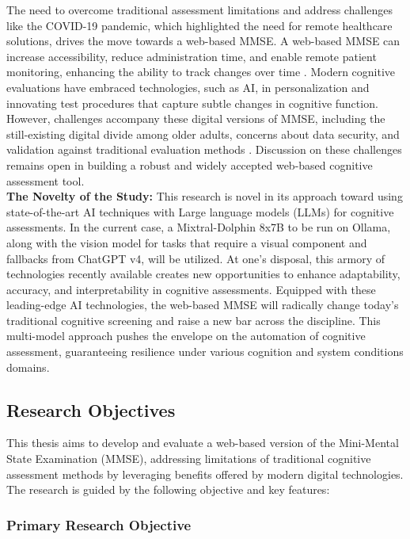 The need to overcome traditional assessment limitations and address challenges like the COVID-19 pandemic, which highlighted the need for remote healthcare solutions, drives the move towards a web-based MMSE. A web-based MMSE can increase accessibility, reduce administration time, and enable remote patient monitoring, enhancing the ability to track changes over time \cite{Bauer2012, Seifan2015, Zygouris2017, Geddes2020, Cullum2014, Lim2020, Harrington2021}. Modern cognitive evaluations have embraced technologies, such as AI, in personalization and innovating test procedures that capture subtle changes in cognitive function. However, challenges accompany these digital versions of MMSE, including the still-existing digital divide among older adults, concerns about data security, and validation against traditional evaluation methods \cite{Bilder2020, Wild2021}. Discussion on these challenges remains open in building a robust and widely accepted web-based cognitive assessment tool.\\

\noindent\textbf{The Novelty of the Study:} This research is novel in its approach toward using state-of-the-art AI techniques with Large language models (LLMs) for cognitive assessments. In the current case, a Mixtral-Dolphin 8x7B to be run on Ollama, along with the vision model for tasks that require a visual component and fallbacks from ChatGPT v4, will be utilized. At one's disposal, this armory of technologies recently available creates new opportunities to enhance adaptability, accuracy, and interpretability in cognitive assessments. Equipped with these leading-edge AI technologies, the web-based MMSE will radically change today's traditional cognitive screening and raise a new bar across the discipline. This multi-model approach pushes the envelope on the automation of cognitive assessment, guaranteeing resilience under various cognition and system conditions domains.

\subsection{Research Objectives}

This thesis aims to develop and evaluate a web-based version of the Mini-Mental State Examination (MMSE), addressing limitations of traditional cognitive assessment methods by leveraging benefits offered by modern digital technologies. The research is guided by the following objective and key features:

\subsubsection{Primary Research Objective}

